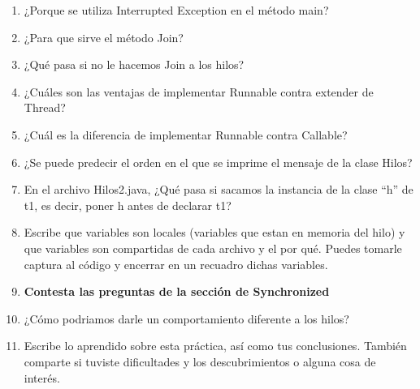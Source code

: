 \documentclass{article}
\begin{document}
\begin{enumerate}
    \item ¿Porque se utiliza Interrupted Exception en el método main?
    
    \item ¿Para que sirve el método Join?
    
    \item ¿Qué pasa si no le hacemos Join a los hilos?
    
    \item ¿Cuáles son las ventajas de implementar Runnable contra extender de Thread?
    
    \item ¿Cuál es la diferencia de implementar Runnable contra Callable?
    
    \item ¿Se puede predecir el orden en el que se imprime el mensaje de la clase Hilos?
    
    \item En el archivo Hilos2.java, ¿Qué pasa si sacamos la instancia de la clase “h” de t1, es decir, poner h antes de declarar t1?
    
    \item Escribe que variables son locales (variables que estan en memoria del hilo) y que variables son compartidas de cada archivo y el por qué. Puedes tomarle captura al código y encerrar en un recuadro dichas variables.
    
    \item \textbf{Contesta las preguntas de la sección de Synchronized}
    \item ¿Cómo podriamos darle un comportamiento diferente a los hilos?
    \item Escribe lo aprendido sobre esta práctica, así como tus conclusiones. También comparte si tuviste dificultades y los descubrimientos o alguna cosa de interés.
\end{enumerate}
\end{document}
